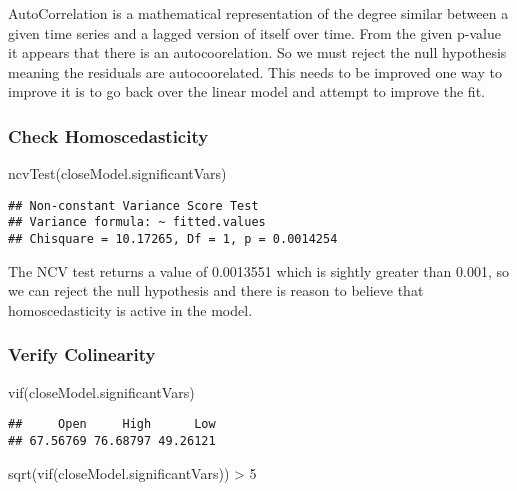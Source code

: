 \documentclass[
]{article}
\newenvironment{Shaded}{\begin{snugshade}}{\end{snugshade}}
\newcommand{\DecValTok}[1]{\textcolor[rgb]{0.00,0.00,0.81}{#1}}
\newcommand{\FunctionTok}[1]{\textcolor[rgb]{0.00,0.00,0.00}{#1}}
\newcommand{\NormalTok}[1]{#1}
\newcommand{\SpecialCharTok}[1]{\textcolor[rgb]{0.00,0.00,0.00}{#1}}
\begin{document}
AutoCorrelation is a mathematical representation of the degree similar
between a given time series and a lagged version of itself over time.
From the given p-value it appears that there is an autocoorelation. So
we must reject the null hypothesis meaning the residuals are
autocoorelated. This needs to be improved one way to improve it is to go
back over the linear model and attempt to improve the fit.

\hypertarget{check-homoscedasticity-1}{%
\subsubsection{Check Homoscedasticity}\label{check-homoscedasticity-1}}

\begin{Shaded}
\begin{Highlighting}[]
\FunctionTok{ncvTest}\NormalTok{(closeModel.significantVars)}
\end{Highlighting}
\end{Shaded}

\begin{verbatim}
## Non-constant Variance Score Test 
## Variance formula: ~ fitted.values 
## Chisquare = 10.17265, Df = 1, p = 0.0014254
\end{verbatim}

The NCV test returns a value of 0.0013551 which is sightly greater than
0.001, so we can reject the null hypothesis and there is reason to
believe that homoscedasticity is active in the model.

\hypertarget{verify-colinearity}{%
\subsubsection{Verify Colinearity}\label{verify-colinearity}}

\begin{Shaded}
\begin{Highlighting}[]
\FunctionTok{vif}\NormalTok{(closeModel.significantVars)}
\end{Highlighting}
\end{Shaded}

\begin{verbatim}
##     Open     High      Low 
## 67.56769 76.68797 49.26121
\end{verbatim}

\begin{Shaded}
\begin{Highlighting}[]
\FunctionTok{sqrt}\NormalTok{(}\FunctionTok{vif}\NormalTok{(closeModel.significantVars)) }\SpecialCharTok{\textgreater{}} \DecValTok{5}
\end{Highlighting}
\end{Shaded}
\end{document}
